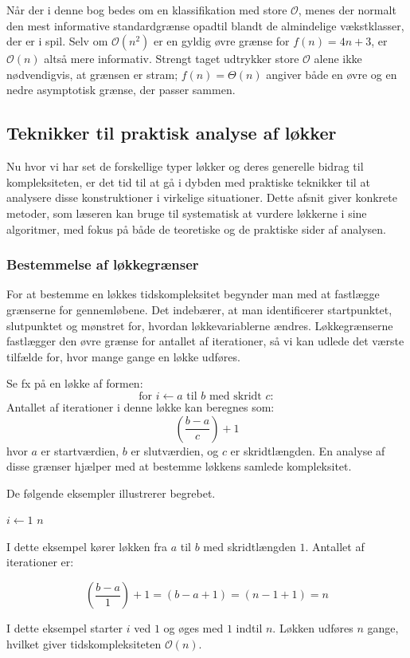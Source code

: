 Når der i denne bog bedes om en klassifikation med store $\mathcal{O}$, menes der normalt den mest informative standardgrænse opadtil blandt de almindelige vækstklasser, der er i spil. Selv om $\mathcal{O}(n^2)$ er en gyldig øvre grænse for $f(n)=4n+3$, er $\mathcal{O}(n)$ altså mere informativ. Strengt taget udtrykker store $\mathcal{O}$ alene ikke nødvendigvis, at grænsen er stram; $f(n)=\Theta(n)$ angiver både en øvre og en nedre asymptotisk grænse, der passer sammen.

\subsection*{Teknikker til praktisk analyse af løkker}

Nu hvor vi har set de forskellige typer løkker og deres generelle bidrag til kompleksiteten, er det tid til at gå i dybden med praktiske teknikker til at analysere disse konstruktioner i virkelige situationer. Dette afsnit giver konkrete metoder, som læseren kan bruge til systematisk at vurdere løkkerne i sine algoritmer, med fokus på både de teoretiske og de praktiske sider af analysen.

\subsubsection*{Bestemmelse af løkkegrænser}
For at bestemme en løkkes tidskompleksitet begynder man med at fastlægge grænserne for gennemløbene. Det indebærer, at man identificerer startpunktet, slutpunktet og mønstret for, hvordan løkkevariablerne ændres. Løkkegrænserne fastlægger den øvre grænse for antallet af iterationer, så vi kan udlede det værste tilfælde for, hvor mange gange en løkke udføres.

Se fx på en løkke af formen:
\[ 
\text{for } i \gets a \text{ til } b \text{ med skridt } c:
\]
Antallet af iterationer i denne løkke kan beregnes som:
\[
\left(\frac{b - a}{c}\right) + 1
\]
hvor $a$ er startværdien, $b$ er slutværdien, og $c$ er skridtlængden. En analyse af disse grænser hjælper med at bestemme løkkens samlede kompleksitet.

De følgende eksempler illustrerer begrebet.

\begin{example}

    \begin{codebox}
        \li \For $i \gets 1$ \To $n$ \Do
        \li     {}
            \End
    \end{codebox}

I dette eksempel kører løkken fra $a$ til $b$ med skridtlængden $1$. Antallet af iterationer er:

\[
\left( \frac{b - a}{1} \right) + 1 = (b - a + 1) = (n - 1 + 1) = n 
\]

I dette eksempel starter $i$ ved $1$ og øges med $1$ indtil $n$. Løkken udføres $n$ gange, hvilket giver tidskompleksiteten $\mathcal{O}(n)$.

\end{example}

